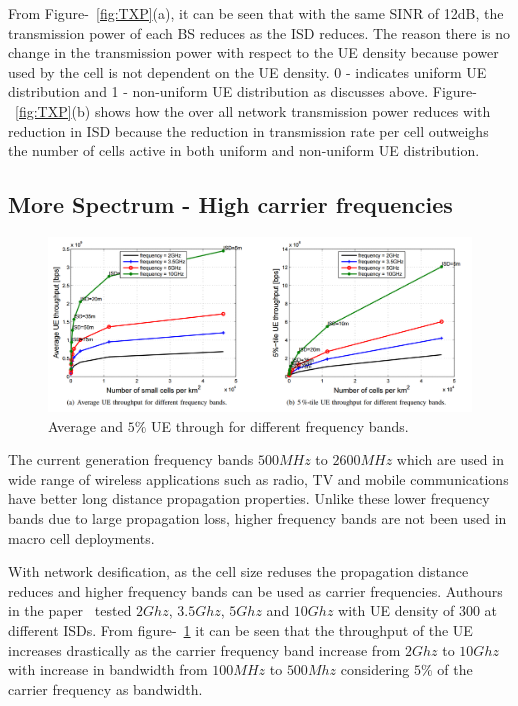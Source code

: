 \documentclass[12pt,onecolumn]{IEEEtran}
\begin{document}
From Figure-~\ref{fig:TXP}(a), it can be seen that with the same SINR of 12dB, the transmission power of each BS reduces as the ISD reduces. The reason there is no change in the transmission power with respect to the UE density because power used by the cell is not dependent on the UE density. 0 - indicates uniform UE distribution and 1 - non-uniform UE distribution as discusses above. Figure-~\ref{fig:TXP}(b) shows how the over all network transmission power reduces with reduction in ISD because the reduction in transmission rate per cell outweighs the number of cells active in both uniform and non-uniform UE distribution.

\subsection{More Spectrum - High carrier frequencies}
\label{subsec:MSF}

\begin{figure}[ht]
\includegraphics[scale=0.32]{high_freq}
\centering
\caption{Average and $5\%$ UE through for different frequency bands.~\cite{main_paper}}
\label{fig:HF}
\end{figure}

The current generation frequency bands $500MHz$ to $2600MHz$ which are used in wide range of wireless applications such as radio, TV and mobile communications have better long distance propagation properties. Unlike these lower frequency bands due to large propagation loss, higher frequency bands are not been used in macro cell deployments.

With network desification, as the cell size reduses the propagation distance reduces and higher frequency bands can be used as carrier frequencies. Authours in the paper~\cite{main_paper} tested $2Ghz$, $3.5Ghz$, $5Ghz$ and $10Ghz$ with UE density of 300 at different ISDs. From figure-~\ref{fig:HF} it can be seen that the throughput of the UE increases drastically as the carrier frequency band increase from $2Ghz$ to $10Ghz$ with increase in bandwidth from $100MHz$ to $500Mhz$ considering $5\%$ of the carrier frequency as bandwidth. 
\end{document}

